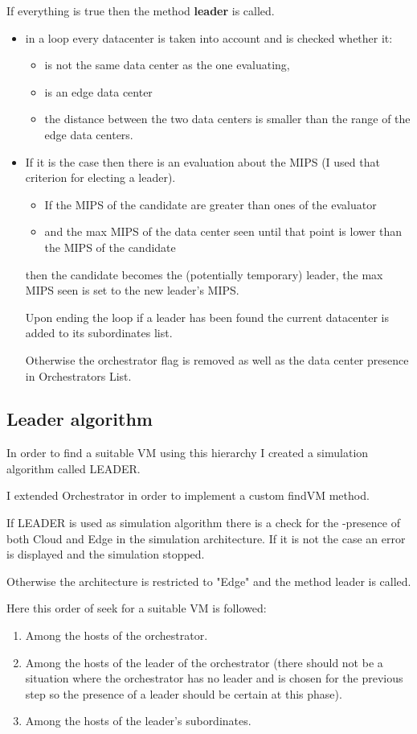 \documentclass[12pt, a4paper]{report} %
\begin{document}
If everything is true then the method \textbf{leader} is called.
  	\begin{itemize}
 		\item in a loop every datacenter is taken into account and is checked whether it:
 		\begin{itemize}
 			\item is not the same data center as the one evaluating,
 			\item is an edge data center
 			\item the distance between the two data centers is smaller than the range of the edge data centers.
 		\end{itemize}
 		\item If it is the case then there is an evaluation about the MIPS (I used that criterion for electing a leader).
 		\begin{itemize}
 			\item If the MIPS of the candidate are greater than ones of the evaluator
 			\item and the max MIPS of the data center seen until that point is lower than the MIPS of the candidate
 		\end{itemize}

then the candidate becomes the (potentially temporary) leader, the max MIPS seen is set to the new leader's MIPS.

Upon ending the loop if a leader has been found the current datacenter is added to its subordinates list.
 		
Otherwise the orchestrator flag is removed as well as the data center presence in Orchestrators List.
  	\end{itemize}
\subsection*{Leader algorithm}
In order to find a suitable VM using this hierarchy I created a simulation algorithm called LEADER.

I extended Orchestrator in order to implement a custom findVM method.

If LEADER is used as simulation algorithm there is a check for the -presence of both Cloud and Edge in the simulation architecture. If it is not the case an error is displayed and the simulation stopped.

Otherwise the architecture is restricted to "Edge" and the method leader is called.

Here this order of seek for a suitable VM is followed:
\begin{enumerate}
	\item Among the hosts of the orchestrator.
	\item Among the hosts of the leader of the orchestrator (there should not be a situation where the orchestrator has no leader and is chosen for the previous step so the presence of a leader should be certain at this phase).
	\item Among the hosts of the leader's subordinates.
\end{enumerate}
\end{document}
